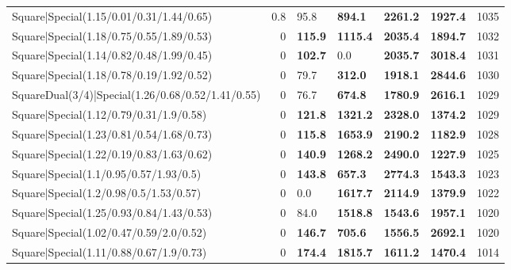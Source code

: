\begin{tabular}{lrllllr}
 Square|Special(1.15/0.01/0.31/1.44/0.65)                      &             0.8 & 95.8           & \textbf{894.1}  & \textbf{2261.2} & \textbf{1927.4} &         1035 \\
 Square|Special(1.18/0.75/0.55/1.89/0.53)                      &             0   & \textbf{115.9} & \textbf{1115.4} & \textbf{2035.4} & \textbf{1894.7} &         1032 \\
 Square|Special(1.14/0.82/0.48/1.99/0.45)                      &             0   & \textbf{102.7} & 0.0             & \textbf{2035.7} & \textbf{3018.4} &         1031 \\
 Square|Special(1.18/0.78/0.19/1.92/0.52)                      &             0   & 79.7           & \textbf{312.0}  & \textbf{1918.1} & \textbf{2844.6} &         1030 \\
 SquareDual(3/4)|Special(1.26/0.68/0.52/1.41/0.55)             &             0   & 76.7           & \textbf{674.8}  & \textbf{1780.9} & \textbf{2616.1} &         1029 \\
 Square|Special(1.12/0.79/0.31/1.9/0.58)                       &             0   & \textbf{121.8} & \textbf{1321.2} & \textbf{2328.0} & \textbf{1374.2} &         1029 \\
 Square|Special(1.23/0.81/0.54/1.68/0.73)                      &             0   & \textbf{115.8} & \textbf{1653.9} & \textbf{2190.2} & \textbf{1182.9} &         1028 \\
 Square|Special(1.22/0.19/0.83/1.63/0.62)                      &             0   & \textbf{140.9} & \textbf{1268.2} & \textbf{2490.0} & \textbf{1227.9} &         1025 \\
 Square|Special(1.1/0.95/0.57/1.93/0.5)                        &             0   & \textbf{143.8} & \textbf{657.3}  & \textbf{2774.3} & \textbf{1543.3} &         1023 \\
 Square|Special(1.2/0.98/0.5/1.53/0.57)                        &             0   & 0.0            & \textbf{1617.7} & \textbf{2114.9} & \textbf{1379.9} &         1022 \\
 Square|Special(1.25/0.93/0.84/1.43/0.53)                      &             0   & 84.0           & \textbf{1518.8} & \textbf{1543.6} & \textbf{1957.1} &         1020 \\
 Square|Special(1.02/0.47/0.59/2.0/0.52)                       &             0   & \textbf{146.7} & \textbf{705.6}  & \textbf{1556.5} & \textbf{2692.1} &         1020 \\
 Square|Special(1.11/0.88/0.67/1.9/0.73)                       &             0   & \textbf{174.4} & \textbf{1815.7} & \textbf{1611.2} & \textbf{1470.4} &         1014 \\

\end{tabular}
